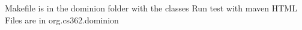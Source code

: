 Makefile is in the dominion folder with the classes
Run test with maven
HTML Files are in org.cs362.dominion